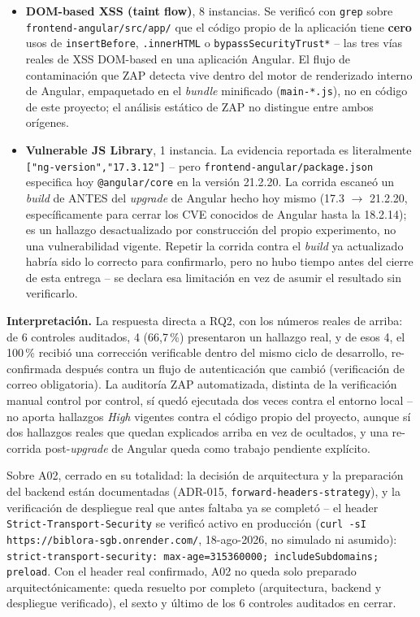 \begin{itemize}[leftmargin=1.2cm]
  \item \textbf{DOM-based XSS (taint flow)}, 8 instancias. Se verificó
    con \texttt{grep} sobre \texttt{frontend-angular/src/app/} que el
    código propio de la aplicación tiene \textbf{cero} usos de
    \texttt{insertBefore}, \texttt{.innerHTML} o
    \texttt{bypassSecurityTrust*} -- las tres vías reales de XSS
    DOM-based en una aplicación Angular. El flujo de contaminación que
    ZAP detecta vive dentro del motor de renderizado interno de
    Angular, empaquetado en el \emph{bundle} minificado
    (\texttt{main-*.js}), no en código de este proyecto; el análisis
    estático de ZAP no distingue entre ambos orígenes.
  \item \textbf{Vulnerable JS Library}, 1 instancia. La evidencia
    reportada es literalmente \texttt{["ng-version","17.3.12"]} -- pero
    \texttt{frontend-angular/package.json} especifica hoy
    \texttt{@angular/core} en la versión 21.2.20. La corrida escaneó un
    \emph{build} de ANTES del \emph{upgrade} de Angular hecho hoy mismo
    (17.3 $\to$ 21.2.20, específicamente para cerrar los CVE conocidos
    de Angular hasta la 18.2.14); es un hallazgo desactualizado por
    construcción del propio experimento, no una vulnerabilidad vigente.
    Repetir la corrida contra el \emph{build} ya actualizado habría sido
    lo correcto para confirmarlo, pero no hubo tiempo antes del cierre
    de esta entrega -- se declara esa limitación en vez de asumir el
    resultado sin verificarlo.
\end{itemize}

\textbf{Interpretación.} La respuesta directa a RQ2, con los números
reales de arriba: de 6 controles auditados, 4 (66,7\,\%) presentaron un
hallazgo real, y de esos 4, el 100\,\% recibió una corrección verificable
dentro del mismo ciclo de desarrollo, re-confirmada después contra un
flujo de autenticación que cambió (verificación de correo obligatoria).
La auditoría ZAP automatizada, distinta de la verificación manual
control por control, sí quedó ejecutada dos veces contra el entorno
local -- no aporta hallazgos \emph{High} vigentes contra el código
propio del proyecto, aunque sí dos hallazgos reales que quedan
explicados arriba en vez de ocultados, y una re-corrida post-\emph{upgrade}
de Angular queda como trabajo pendiente explícito.

Sobre A02, cerrado en su totalidad: la decisión de arquitectura y la
preparación del backend están documentadas (ADR-015,
\texttt{forward-headers-strategy}), y la verificación de despliegue
real que antes faltaba ya se completó -- el header
\texttt{Strict-Transport-Security} se verificó activo en producción
(\texttt{curl -sI https://biblora-sgb.onrender.com/}, 18-ago-2026, no
simulado ni asumido):
\texttt{strict-transport-security: max-age=315360000;\allowbreak
includeSubdomains; preload}. Con el header real confirmado, A02 no
queda solo preparado arquitectónicamente: queda resuelto por completo
(arquitectura, backend y despliegue verificado), el sexto y último de
los 6 controles auditados en cerrar.

